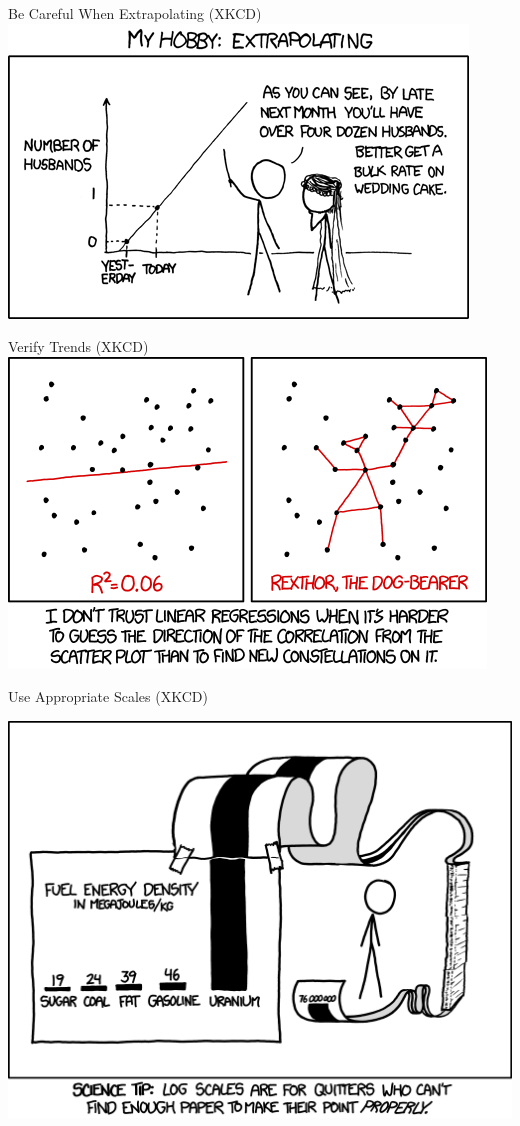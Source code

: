 \documentclass[ignorenonframetext,xcolor=x11names]{beamer}
\begin{document}
\begin{frame}{Be Careful When Extrapolating (XKCD)}
\centering
  \includegraphics[width=\textwidth]{xkcd_extrapolating.png}
\end{frame}

\begin{frame}{Verify Trends (XKCD)}
\centering
  \includegraphics[width=\textwidth]{xkcd_linear_regression.png}
\end{frame}

\begin{frame}{Use Appropriate Scales (XKCD)}
\centering

  \includegraphics[width=\textwidth]{xkcd_log_scale.png}
\end{frame}
\end{document}
